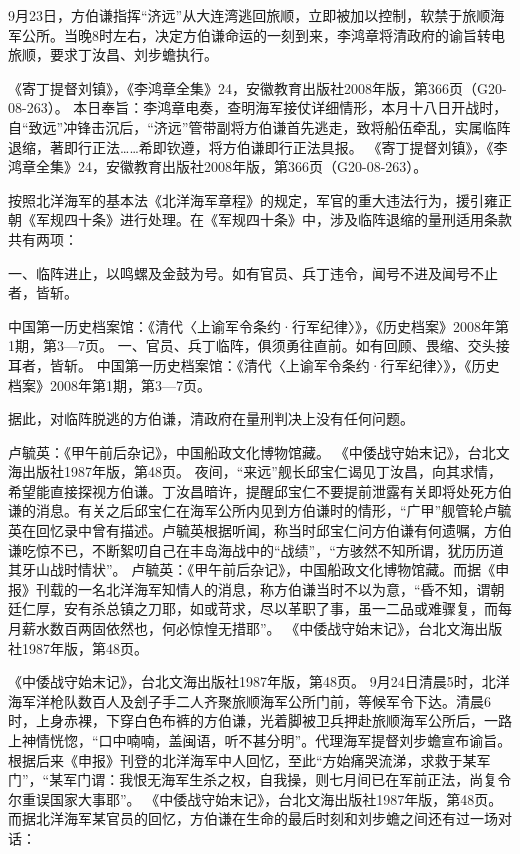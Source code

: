 \documentclass[12pt,UTF8]{ctexbook}
\begin{document}
9月23日，方伯谦指挥“济远”从大连湾逃回旅顺，立即被加以控制，软禁于旅顺海军公所。当晚8时左右，决定方伯谦命运的一刻到来，李鸿章将清政府的谕旨转电旅顺，要求丁汝昌、刘步蟾执行。

《寄丁提督刘镇》，《李鸿章全集》24，安徽教育出版社2008年版，第366页（G20-08-263）。
本日奉旨：李鸿章电奏，查明海军接仗详细情形，本月十八日开战时，自“致远”冲锋击沉后，“济远”管带副将方伯谦首先逃走，致将船伍牵乱，实属临阵退缩，著即行正法……希即钦遵，将方伯谦即行正法具报。 《寄丁提督刘镇》，《李鸿章全集》24，安徽教育出版社2008年版，第366页（G20-08-263）。

按照北洋海军的基本法《北洋海军章程》的规定，军官的重大违法行为，援引雍正朝《军规四十条》进行处理。在《军规四十条》中，涉及临阵退缩的量刑适用条款共有两项：

一、临阵进止，以鸣螺及金鼓为号。如有官员、兵丁违令，闻号不进及闻号不止者，皆斩。

中国第一历史档案馆：《清代〈上谕军令条约·行军纪律〉》，《历史档案》2008年第1期，第3—7页。
一、官员、兵丁临阵，俱须勇往直前。如有回顾、畏缩、交头接耳者，皆斩。 中国第一历史档案馆：《清代〈上谕军令条约·行军纪律〉》，《历史档案》2008年第1期，第3—7页。

据此，对临阵脱逃的方伯谦，清政府在量刑判决上没有任何问题。

卢毓英：《甲午前后杂记》，中国船政文化博物馆藏。
《中倭战守始末记》，台北文海出版社1987年版，第48页。
夜间，“来远”舰长邱宝仁谒见丁汝昌，向其求情，希望能直接探视方伯谦。丁汝昌暗许，提醒邱宝仁不要提前泄露有关即将处死方伯谦的消息。有关之后邱宝仁在海军公所内见到方伯谦时的情形，“广甲”舰管轮卢毓英在回忆录中曾有描述。卢毓英根据听闻，称当时邱宝仁问方伯谦有何遗嘱，方伯谦吃惊不已，不断絮叨自己在丰岛海战中的“战绩”，“方骇然不知所谓，犹历历道其牙山战时情状”。 卢毓英：《甲午前后杂记》，中国船政文化博物馆藏。而据《申报》刊载的一名北洋海军知情人的消息，称方伯谦当时不以为意，“昏不知，谓朝廷仁厚，安有杀总镇之刀耶，如或苛求，尽以革职了事，虽一二品或难骤复，而每月薪水数百两固依然也，何必惊惶无措耶”。 《中倭战守始末记》，台北文海出版社1987年版，第48页。

《中倭战守始末记》，台北文海出版社1987年版，第48页。
9月24日清晨5时，北洋海军洋枪队数百人及刽子手二人齐聚旅顺海军公所门前，等候军令下达。清晨6时，上身赤裸，下穿白色布裤的方伯谦，光着脚被卫兵押赴旅顺海军公所后，一路上神情恍惚，“口中喃喃，盖闽语，听不甚分明”。代理海军提督刘步蟾宣布谕旨。根据后来《申报》刊登的北洋海军中人回忆，至此“方始痛哭流涕，求救于某军门”，“某军门谓：我恨无海军生杀之权，自我操，则七月间已在军前正法，尚复令尔重误国家大事耶”。 《中倭战守始末记》，台北文海出版社1987年版，第48页。而据北洋海军某官员的回忆，方伯谦在生命的最后时刻和刘步蟾之间还有过一场对话：
\end{document}
